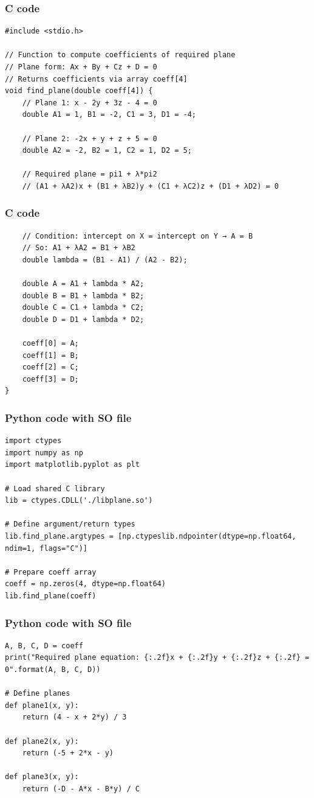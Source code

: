 \documentclass{beamer}
\begin{document}
\begin{frame}[fragile]
\frametitle{C code}
\begin{lstlisting}
#include <stdio.h>

// Function to compute coefficients of required plane
// Plane form: Ax + By + Cz + D = 0
// Returns coefficients via array coeff[4]
void find_plane(double coeff[4]) {
    // Plane 1: x - 2y + 3z - 4 = 0
    double A1 = 1, B1 = -2, C1 = 3, D1 = -4;

    // Plane 2: -2x + y + z + 5 = 0
    double A2 = -2, B2 = 1, C2 = 1, D2 = 5;

    // Required plane = pi1 + λ*pi2
    // (A1 + λA2)x + (B1 + λB2)y + (C1 + λC2)z + (D1 + λD2) = 0
\end{lstlisting}
\end{frame}
\begin{frame}[fragile]
\frametitle{C code}
\begin{lstlisting}
    // Condition: intercept on X = intercept on Y → A = B
    // So: A1 + λA2 = B1 + λB2
    double lambda = (B1 - A1) / (A2 - B2);

    double A = A1 + lambda * A2;
    double B = B1 + lambda * B2;
    double C = C1 + lambda * C2;
    double D = D1 + lambda * D2;

    coeff[0] = A;
    coeff[1] = B;
    coeff[2] = C;
    coeff[3] = D;
}
\end{lstlisting}
\end{frame}
\begin{frame}[fragile]
\frametitle{Python code with SO file}
\begin{lstlisting}
import ctypes
import numpy as np
import matplotlib.pyplot as plt

# Load shared C library
lib = ctypes.CDLL('./libplane.so')

# Define argument/return types
lib.find_plane.argtypes = [np.ctypeslib.ndpointer(dtype=np.float64, ndim=1, flags="C")]

# Prepare coeff array
coeff = np.zeros(4, dtype=np.float64)
lib.find_plane(coeff)
\end{lstlisting}
\end{frame}
\begin{frame}[fragile]
\frametitle{Python code with SO file}
\begin{lstlisting}
A, B, C, D = coeff
print("Required plane equation: {:.2f}x + {:.2f}y + {:.2f}z + {:.2f} = 0".format(A, B, C, D))

# Define planes
def plane1(x, y):
    return (4 - x + 2*y) / 3

def plane2(x, y):
    return (-5 + 2*x - y)

def plane3(x, y):
    return (-D - A*x - B*y) / C
\end{lstlisting}
\end{frame}
\end{document}
